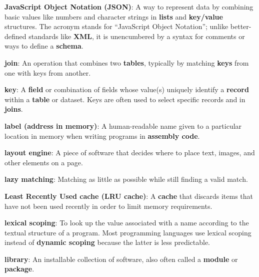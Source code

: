 \documentclass[krantzl]{krantz}
\newcommand{\glosskey}[1]{\textbf{#1}}
\begin{document}
\noindent \textbf{{\newline}\glosskey{JavaScript Object Notation} (JSON)}: 
A way to represent data by combining basic values like numbers and character strings in \glosskey{lists} and \glosskey{key/value} structures. The acronym stands for “JavaScript Object Notation”; unlike better-defined standards like \glosskey{XML}, it is unencumbered by a syntax for comments or ways to define a \glosskey{schema}.


\noindent \textbf{{\newline}\glosskey{join}}: 
An operation that combines two \glosskey{tables}, typically by matching \glosskey{keys} from one with keys from another.


\noindent \textbf{{\newline}\glosskey{key}}: 
A \glosskey{field} or combination of fields whose value(s) uniquely identify a \glosskey{record} within a \glosskey{table} or dataset. Keys are often used to select specific records and in \glosskey{joins}.


\noindent \textbf{{\newline}\glosskey{label (address in memory)}}: 
A human-readable name given to a particular location in memory when writing programs in \glosskey{assembly code}.


\noindent \textbf{{\newline}\glosskey{layout engine}}: 
A piece of software that decides where to place text, images, and other elements on a page.


\noindent \textbf{{\newline}\glosskey{lazy matching}}: 
Matching as little as possible while still finding a valid match.


\noindent \textbf{{\newline}\glosskey{Least Recently Used cache} (LRU cache)}: 
A \glosskey{cache} that discards items that have not been used recently in order to limit memory requirements.


\noindent \textbf{{\newline}\glosskey{lexical scoping}}: 
To look up the value associated with a name according to the textual structure of a program. Most programming languages use lexical scoping instead of \glosskey{dynamic scoping} because the latter is less predictable.


\noindent \textbf{{\newline}\glosskey{library}}: 
An installable collection of software, also often called a \glosskey{module} or \glosskey{package}.
\end{document}
